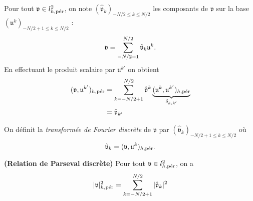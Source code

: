 Pour tout $\mathfrak{v} \in l^2_{h,\per}$, on note $(\hat{\mathfrak{v}}_k )_{-N/2 \leq k \leq N/2}$ les composants de $\mathfrak{v}$ sur la base $(\mathfrak{u}^k)_{-N/2 +1 \leq k \leq N/2}$ :
\begin{equation}
\mathfrak{v} = \gsum_{-N/2+1}^{N/2} \hat{\mathfrak{v}}_k \mathfrak{u}^k.
\end{equation}
En effectuant le produit scalaire par $\mathfrak{u}^{k'}$ on obtient
\begin{align*}
(\mathfrak{v}, \mathfrak{u}^{k'})_{h,\per} & = \gsum_{k=-N/2+1}^{N/2} \hat{\mathfrak{v}}^k \underbrace{(\mathfrak{u}^k, \mathfrak{u}^{k'})_{h,\per}}_{\delta_{k,k'}} \\
		& = \hat{\mathfrak{v}}_{k'}
\end{align*}

\begin{definition}
On définit la \textit{transformée de Fourier discrète} de $\mathfrak{v}$ par $(\hat{\mathfrak{v}}_{k})_{-N/2+1 \leq k \leq N/2}$ où
\begin{equation}
\hat{\mathfrak{v}}_{k} = (\mathfrak{v}, \mathfrak{u}^{k})_{h,\per}.
\end{equation}
\end{definition}

\begin{proposition}
\textbf{(Relation de Parseval discrète)} 
Pour tout $\mathfrak{v} \in l^2_{h,\per}$, on a 
\begin{equation}
|\mathfrak{v}|_{h,\per}^2 = \gsum_{k=-N/2+1}^{N/2} |\hat{\mathfrak{v}}_k|^2
\end{equation}
\end{proposition}

